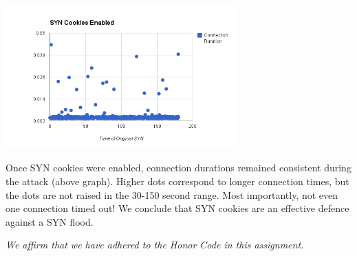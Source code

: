 \documentclass[11pt]{article}
\begin{document}
\begin{enumerate}
  \begin{center}
    \includegraphics[width=3.5in]{with-cookies.png}
  \end{center}
  Once SYN cookies were enabled, connection durations remained consistent during the attack (above graph).  Higher dots correspond to longer connection times, but the dots are not raised in the 30-150 second range.  Most importantly, not even one connection timed out!  We conclude that SYN cookies are an effective defence against a SYN flood.
\end{enumerate}
\emph{We affirm that we have adhered to the Honor Code in this assignment.}
\end{document}
